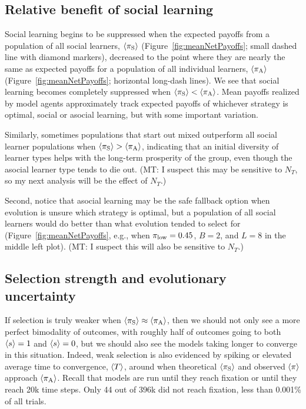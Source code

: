 \documentclass[letterpaper,11.5pt]{scrartcl}
\newcommand{\mt}[1]{{\textcolor{myorange} {({\tiny MT:} #1)}}}
\begin{document}
\subsection{Relative benefit of social learning}

Social learning begins to be suppressed when the expected payoffs from 
a population of all social learners, $\langle \pi_\mathrm{S} \rangle$ (Figure~\ref{fig:meanNetPayoffs};
small dashed line with diamond markers),
decreased to the point where they are nearly the same as expected payoffs for
a population of all individual learners, $\langle \pi_\mathrm{A} \rangle$
(Figure~\ref{fig:meanNetPayoffs}; horizontal long-dash lines). We see that social 
learning becomes completely suppressed when $\langle \pi_\mathrm{S} \rangle < \langle \pi_\mathrm{A} \rangle$.  Mean 
payoffs realized by model agents approximately track expected payoffs of
whichever strategy is optimal, social or asocial learning, but with some important
variation.

Similarly, sometimes populations that start out mixed outperform all
social learner populations when $\langle \pi_\mathrm{S} \rangle > \langle \pi_\mathrm{A} \rangle$, indicating that an initial
diversity of learner types helps with the long-term prosperity of the group, even
though the asocial learner type tends to die out. \mt{I suspect
this may be sensitive to $N_T$, so my next analysis will be the effect
of $N_T$.}

Second, notice that asocial learning may be the safe fallback option when 
evolution is unsure which strategy is optimal, 
but a population of all social learners would do better
than what evolution tended to select for (Figure~\ref{fig:meanNetPayoffs},
e.g., when $\pi_{\mathrm{low}}=0.45$, $B=2$, and $L=8$ in the middle left plot). \mt{I suspect
this will also be sensitive to $N_T$.} 


\subsection{Selection strength and evolutionary uncertainty}

If selection is truly weaker when $\langle \pi_\mathrm{S} \rangle \approx \langle \pi_\mathrm{A} \rangle$, then we should not
only see a more perfect bimodality of outcomes, with roughly half of outcomes going
to both $\langle s \rangle = 1$ and $\langle s \rangle = 0$, but we should also see the models taking
longer to converge in this situation.  Indeed, weak selection is also evidenced by
spiking or elevated average time to convergence, $\langle T \rangle$, around when theoretical
$\langle \pi_\mathrm{S} \rangle$ and observed $\langle \pi \rangle$ approach $\langle \pi_\mathrm{A} \rangle$. Recall that models are run
until they reach fixation or until they reach 20k time steps. Only 44 out of 396k
did not reach fixation, less than 0.001\% of all trials.
\end{document}
